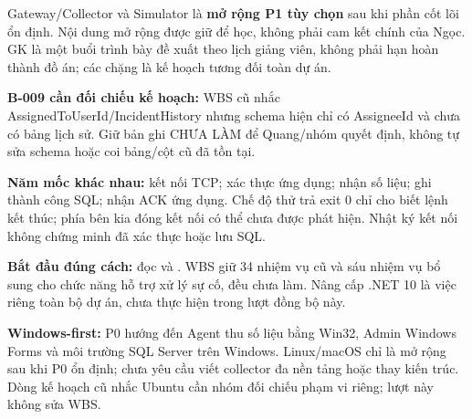 Gateway/Collector và Simulator là \textbf{mở rộng P1 tùy chọn} sau khi phần cốt lõi ổn định. Nội dung mở rộng được giữ để học, không phải cam kết chính của Ngọc. GK là một buổi trình bày đề xuất theo lịch giảng viên, không phải hạn hoàn thành đồ án; các chặng là kế hoạch tương đối toàn dự án.

\textbf{B-009 cần đối chiếu kế hoạch:} WBS cũ nhắc AssignedToUserId/IncidentHistory nhưng schema hiện chỉ có AssigneeId và chưa có bảng lịch sử. Giữ bản ghi CHƯA LÀM để Quang/nhóm quyết định, không tự sửa schema hoặc coi bảng/cột cũ đã tồn tại.

\textbf{Năm mốc khác nhau:} kết nối TCP; xác thực ứng dụng; nhận số liệu; ghi thành công SQL; nhận ACK ứng dụng. Chế độ thử trả exit 0 chỉ cho biết lệnh kết thúc; phía bên kia đóng kết nối có thể chưa được phát hiện. Nhật ký kết nối không chứng minh đã xác thực hoặc lưu SQL.

\textbf{Bắt đầu đúng cách:} đọc  và . WBS giữ 34 nhiệm vụ cũ và sáu nhiệm vụ bổ sung cho chức năng hỗ trợ xử lý sự cố, đều chưa làm. Nâng cấp .NET 10 là việc riêng toàn bộ dự án, chưa thực hiện trong lượt đồng bộ này.
\newpage

\begin{importantbox}
\textbf{Windows-first:} P0 hướng đến Agent thu số liệu bằng Win32, Admin Windows Forms và môi trường SQL Server trên Windows. Linux/macOS chỉ là mở rộng sau khi P0 ổn định; chưa yêu cầu viết collector đa nền tảng hoặc thay kiến trúc. Dòng kế hoạch cũ nhắc Ubuntu cần nhóm đối chiếu phạm vi riêng; lượt này không sửa WBS.
\end{importantbox}

